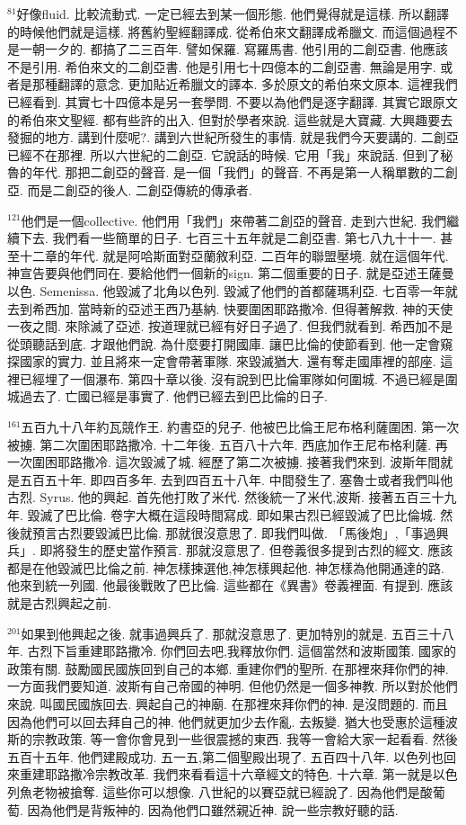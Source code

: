 \documentclass{book}
\begin{document}
$^{81}$好像fluid.
比較流動式.
一定已經去到某一個形態.
他們覺得就是這樣.
所以翻譯的時候他們就是這樣.
將舊約聖經翻譯成.
從希伯來文翻譯成希臘文.
而這個過程不是一朝一夕的.
都搞了二三百年.
譬如保羅.
寫羅馬書.
他引用的二創亞書.
他應該不是引用.
希伯來文的二創亞書.
他是引用七十四億本的二創亞書.
無論是用字.
或者是那種翻譯的意念.
更加貼近希臘文的譯本.
多於原文的希伯來文原本.
這裡我們已經看到.
其實七十四億本是另一套學問.
不要以為他們是逐字翻譯.
其實它跟原文的希伯來文聖經.
都有些許的出入.
但對於學者來說.
這些就是大寶藏.
大興趣要去發掘的地方.
講到什麼呢?.
講到六世紀所發生的事情.
就是我們今天要講的.
二創亞已經不在那裡.
所以六世紀的二創亞.
它說話的時候.
它用「我」來說話.
但到了秘魯的年代.
那把二創亞的聲音.
是一個「我們」的聲音.
不再是第一人稱單數的二創亞.
而是二創亞的後人.
二創亞傳統的傳承者.

$^{121}$他們是一個collective.
他們用「我們」來帶著二創亞的聲音.
走到六世紀.
我們繼續下去.
我們看一些簡單的日子.
七百三十五年就是二創亞書.
第七八九十十一.
甚至十二章的年代.
就是阿哈斯面對亞蘭敘利亞.
二百年的聯盟壓境.
就在這個年代.
神宣告要與他們同在.
要給他們一個新的sign.
第二個重要的日子.
就是亞述王薩曼以色.
Semenissa.
他毀滅了北角以色列.
毀滅了他們的首都薩瑪利亞.
七百零一年就去到希西加.
當時新的亞述王西乃基納.
快要圍困耶路撒冷.
但得著解救.
神的天使一夜之間.
來除滅了亞述.
按道理就已經有好日子過了.
但我們就看到.
希西加不是從頭聽話到底.
才跟他們說.
為什麼要打開國庫.
讓巴比倫的使節看到.
他一定會窺探國家的實力.
並且將來一定會帶著軍隊.
來毀滅猶大.
還有奪走國庫裡的部座.
這裡已經埋了一個瀑布.
第四十章以後.
沒有說到巴比倫軍隊如何圍城.
不過已經是圍城過去了.
亡國已經是事實了.
他們已經去到巴比倫的日子.

$^{161}$五百九十八年約瓦競作王.
約書亞的兒子.
他被巴比倫王尼布格利薩圍困.
第一次被擄.
第二次圍困耶路撒冷.
十二年後.
五百八十六年.
西底加作王尼布格利薩.
再一次圍困耶路撒冷.
這次毀滅了城.
經歷了第二次被擄.
接著我們來到.
波斯年間就是五百五十年.
即四百多年.
去到四百五十八年.
中間發生了.
塞魯士或者我們叫他古烈.
Syrus.
他的興起.
首先他打敗了米代.
然後統一了米代,波斯.
接著五百三十九年.
毀滅了巴比倫.
卷字大概在這段時間寫成.
即如果古烈已經毀滅了巴比倫城.
然後就預言古烈要毀滅巴比倫.
那就很沒意思了.
即我們叫做.
「馬後炮」,「事過興兵」.
即將發生的歷史當作預言.
那就沒意思了.
但卷義很多提到古烈的經文.
應該都是在他毀滅巴比倫之前.
神怎樣揀選他,神怎樣興起他.
神怎樣為他開通達的路.
他來到統一列國.
他最後戰敗了巴比倫.
這些都在《異書》卷義裡面.
有提到.
應該就是古烈興起之前.

$^{201}$如果到他興起之後.
就事過興兵了.
那就沒意思了.
更加特別的就是.
五百三十八年.
古烈下旨重建耶路撒冷.
你們回去吧,我釋放你們.
這個當然和波斯國策.
國家的政策有關.
鼓勵國民國族回到自己的本鄉.
重建你們的聖所.
在那裡來拜你們的神.
一方面我們要知道.
波斯有自己帝國的神明.
但他仍然是一個多神教.
所以對於他們來說.
叫國民國族回去.
興起自己的神廟.
在那裡來拜你們的神.
是沒問題的.
而且因為他們可以回去拜自己的神.
他們就更加少去作亂.
去叛變.
猶大也受惠於這種波斯的宗教政策.
等一會你會見到一些很震撼的東西.
我等一會給大家一起看看.
然後五百十五年.
他們建殿成功.
五一五,第二個聖殿出現了.
五百四十八年.
以色列也回來重建耶路撒冷宗教改革.
我們來看看這十六章經文的特色.
十六章.
第一就是以色列魚老物被搶奪.
這些你可以想像.
八世紀的以賽亞就已經說了.
因為他們是酸葡萄.
因為他們是背叛神的.
因為他們口雖然親近神.
說一些宗教好聽的話.
\end{document}
